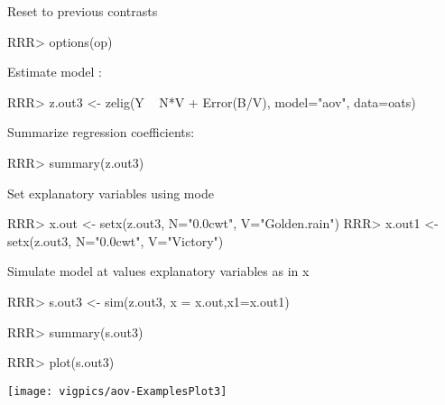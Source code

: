 \begin{enumerate}
Reset to previous contrasts 
\begin{Schunk}
\begin{Sinput}
RRR> options(op)
\end{Sinput}
\end{Schunk}
Estimate model \citep[p.283]{VenRip02}:
\begin{Schunk}
\begin{Sinput}
RRR>  z.out3 <- zelig(Y ~ N*V + Error(B/V), model="aov", data=oats)
\end{Sinput}
\end{Schunk}
Summarize regression coefficients:
\begin{Schunk}
\begin{Sinput}
RRR>  summary(z.out3)
\end{Sinput}
\end{Schunk}
Set explanatory variables using mode
\begin{Schunk}
\begin{Sinput}
RRR>  x.out <- setx(z.out3, N="0.0cwt", V="Golden.rain")
RRR>  x.out1 <- setx(z.out3, N="0.0cwt", V="Victory")
\end{Sinput}
\end{Schunk}
Simulate model at values explanatory variables as in x
\begin{Schunk}
\begin{Sinput}
RRR>  s.out3 <- sim(z.out3, x = x.out,x1=x.out1)
\end{Sinput}
\end{Schunk}
\begin{Schunk}
\begin{Sinput}
RRR> summary(s.out3)
\end{Sinput}
\end{Schunk}
\begin{center}
\begin{Schunk}
\begin{Sinput}
RRR>  plot(s.out3)
\end{Sinput}
\end{Schunk}
\texttt{[image: vigpics/aov-ExamplesPlot3]}
\end{center}

\end{enumerate}

